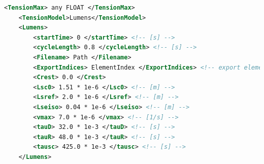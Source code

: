 \begin{lstlisting}[language=XML,caption=.xml settings for the Lumens tension model]
    <TensionMax> any FLOAT </TensionMax>
    <TensionModel>Lumens</TensionModel>
    <Lumens>
        <startTime> 0 </startTime> <!-- [s] -->
        <cycleLength> 0.8 </cycleLength> <!-- [s] -->
        <Filename> Path </Filename>
        <ExportIndices> ElementIndex </ExportIndices> <!-- export element data to file -->
        <Crest> 0.0 </Crest> 
        <Lsc0> 1.51 * 1e-6 </Lsc0> <!-- [m] -->
        <Lsref> 2.0 * 1e-6 </Lsref> <!-- [m] -->
        <Lseiso> 0.04 * 1e-6 </Lseiso> <!-- [m] -->
        <vmax> 7.0 * 1e-6 </vmax> <!-- [1/s] -->
        <tauD> 32.0 * 1e-3 </tauD> <!-- [s] -->
        <tauR> 48.0 * 1e-3 </tauR> <!-- [s] -->
        <tausc> 425.0 * 1e-3 </tausc> <!-- [s] -->
    </Lumens>
\end{lstlisting}

